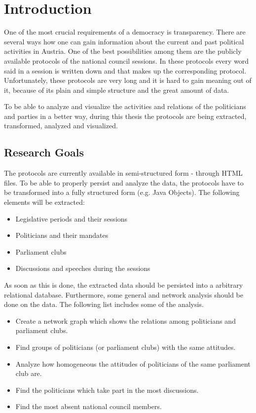 \chapter{Introduction}
\label{sec:introduction}
One of the most crucial requirements of a democracy is transparency. There are several ways how one can gain information about the current and past political activities in Austria. One of the best possibilities among them are the publicly available protocols of the national council sessions. In these protocols every word said in a session is written down and that makes up the corresponding protocol. Unfortunately, these protocols are very long and it is hard to gain meaning out of it, because of its plain and simple structure and the great amount of data.

To be able to analyze and visualize the activities and relations of the politicians and parties in a better way, during this thesis the protocols are being extracted, transformed, analyzed and visualized.

\section{Research Goals}
The protocols are currently available in semi-structured form - through HTML files. To be able to properly persist and analyze the data, the protocols have to be transformed into a fully structured form (e.g. Java Objects). The following elements will be extracted:
\begin{itemize}
  \item Legislative periods and their sessions
  \item Politicians and their mandates
  \item Parliament clubs
  \item Discussions and speeches during the sessions
\end{itemize}

As soon as this is done, the extracted data should be persisted into a arbitrary relational database. Furthermore, some general and network analysis should be done on the data. The following list includes some of the analysis.
\begin{itemize}
  \item Create a network graph which shows the relations among politicians and parliament clubs.
  \item Find groups of politicians (or parliament clubs) with the same attitudes.
  \item Analyze how homogeneous the attitudes of politicians of the same parliament club are.
  \item Find the politicians which take part in the most discussions.
  \item Find the most absent national council members.
\end{itemize}

